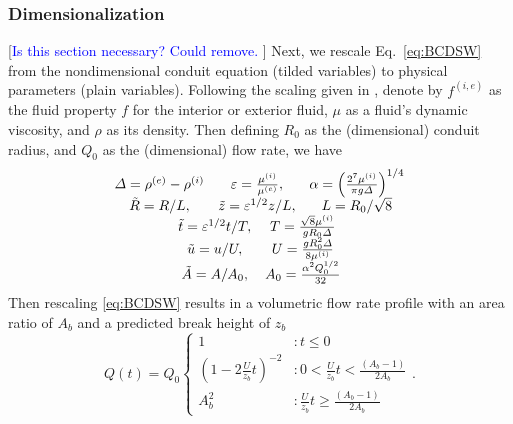\documentclass{jfm}
\newcommand{\MM}[1]{[\textcolor{blue}{#1 }]}
\newcommand{\eps}{\varepsilon}
\newcommand{\ifl}{^{(i)}}
\newcommand{\efl}{^{(e)}}
\begin{document}
\subsubsection{Dimensionalization}\label{sec:Dimensionalization}
\MM{Is this section necessary? Could remove.}
Next, we rescale Eq.~\ref{eq:BCDSW} from the nondimensional conduit equation (tilded variables) to physical parameters (plain variables).
Following the scaling given in \cite{lowman_dispersive_2013}, denote by $f^{(i,e)}$ as the fluid property $f$ for the interior or exterior fluid, $\mu$ as a fluid's dynamic viscosity, and $\rho$ as its density. Then defining $R_0$ as the (dimensional) conduit radius, and $Q_0$ as the (dimensional) flow rate, we have
\begin{equation}
\begin{split}
    \begin{array}{ccc}
        \Delta = \rho\efl-\rho\ifl       & \eps = \frac{\mu\ifl}{\mu\efl}, & \alpha = \left(\frac{2^7\mu\ifl}{\pi g \Delta}\right)^{1/4} \\
        \tilde{R} = R/L, & \tilde{z} = \eps^{1/2}z/L,       & L = R_0/\sqrt{8} \\
    \multicolumn{3}{c}
    {
        \begin{array}{cc}
            \tilde{t} = \eps^{1/2}t/T,                 & T = \frac{\sqrt{8}\mu\ifl}{g R_0 \Delta} \\
            \tilde{u} = u/U,                 & U = \frac{g R_0^2 \Delta}{8 \mu\ifl} \\
            \tilde{A} = A/A_0,               & A_0 = \frac{\alpha^2 Q_0^{1/2}}{32} \\
        \end{array}
    }
    \end{array}
    \end{split}
\end{equation}
Then rescaling \ref{eq:BCDSW} results in a volumetric flow rate profile with an area ratio of $A_b$ and a predicted break height of $z_b$
\begin{equation}\label{eq:FlowRateProfile}
   Q(t) = Q_0
    \begin{cases}
     1                       & :     t \leq 0       \\
     (1-2\frac{U}{z_b}t)^{-2}& :0 < \frac{U}{z_b}t < \frac{(A_b-1)}{2A_b}          \\
     A_b^2                   & :    \frac{U}{z_b}t \geq \frac{(A_b-1)}{2A_b}
    \end{cases}.
\end{equation}
\end{document}
